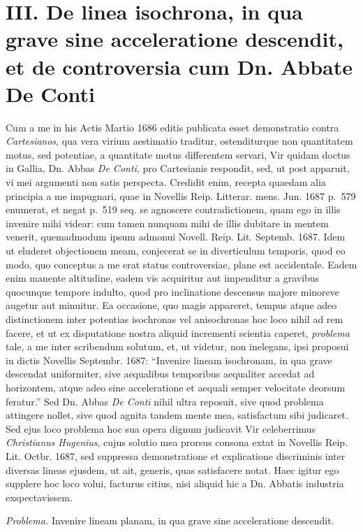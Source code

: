 \documentclass{article}
\begin{document}
\section*{III. De linea isochrona, in qua grave sine acceleratione descendit, et de controversia cum Dn. Abbate De Conti}

Cum a me in his Actis Martio 1686 editis publicata esset demonstratio contra \emph{Cartesianos},
qua vera virium aestimatio traditur, ostenditurque non quantitatem motus, sed potentiae, a
quantitate motus differentem servari, Vir quidam doctus in Gallia, Dn. Abbas \emph{De Conti}, pro
Cartesianis respondit, sed, ut post apparuit, vi mei argumenti non satis perspecta. Credidit enim,
recepta quaedam alia principia a me impugnari, quae in Novellis Reip. Litterar. mens. Jun. 1687
p.~579 enumerat, et negat p.~519 seq. se agnoscere contradictionem, quam ego in illis invenire mihi
videar: cum tamen nunquam mihi de illis dubitare in mentem venerit, quemadmodum ipsum admonui
Novell. Reip. Lit. Septemb. 1687. Idem ut eluderet objectionem meam, conjecerat se in diverticulum
temporis, quod eo modo, quo conceptus a me erat status controversiae, plane est accidentale. Eadem
enim manente altitudine, eadem vis acquiritur aut impenditur a gravibus quocunque tempore indulto,
quod pro inclinatione descensus majore minoreve augetur aut minuitur. Ea occasione, quo magis
appareret, tempus atque adeo distinctionem inter potentias isochronas vel anisochronas hoc loco
nihil ad rem facere, et ut ex disputatione nostra aliquid incrementi scientia caperet,
\emph{problema} tale, a me inter scribendum solutum, et, ut videtur, non inelegans, ipsi proposui
in dictis Novellis Septembr. 1687: ``Invenire lineam isochronam, in qua grave descendat
uniformiter, sive aequalibus temporibus aequaliter accedat ad horizontem, atque adeo sine
acceleratione et aequali semper velocitate deorsum feratur.'' Sed Dn. Abbas \emph{De Conti} nihil
ultra reposuit, sive quod problema attingere nollet, sive quod agnita tandem mente mea,
satisfactum sibi judicaret. Sed ejus loco problema hoc sua opera dignum judicavit Vir celeberrimus
\emph{Christianus Hugenius}, cujus solutio mea prorsus consona extat in Novellis Reip. Lit. Octbr.
1687, sed suppressa demonstratione et explicatione
discriminis inter diversas lineas ejusdem, ut ait, generis, quas satisfacere notat. Haec igitur
ego supplere hoc loco volui, facturus citius, nisi aliquid hic a Dn. Abbatis industria
exspectavissem.

\emph{Problema.} Invenire lineam planam, in qua grave sine acceleratione descendit.
\end{document}
